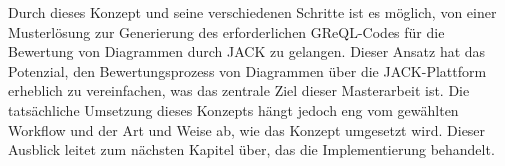 Durch dieses Konzept und seine verschiedenen Schritte ist es möglich, von einer Musterlösung zur Generierung des erforderlichen GReQL-Codes für die Bewertung von Diagrammen durch JACK zu gelangen. Dieser Ansatz hat das Potenzial, den Bewertungsprozess von Diagrammen über die JACK-Plattform erheblich zu vereinfachen, was das zentrale Ziel dieser Masterarbeit ist. Die tatsächliche Umsetzung dieses Konzepts hängt jedoch eng vom gewählten Workflow und der Art und Weise ab, wie das Konzept umgesetzt wird. Dieser Ausblick leitet zum nächsten Kapitel über, das die Implementierung behandelt.